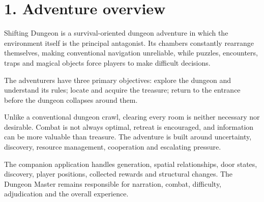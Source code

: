 \section{1. Adventure overview}

Shifting Dungeon is a survival-oriented dungeon adventure in which the environment itself is the principal antagonist. Its chambers constantly rearrange themselves, making conventional navigation unreliable, while puzzles, encounters, traps and magical objects force players to make difficult decisions.

The adventurers have three primary objectives: explore the dungeon and understand its rules; locate and acquire the treasure; return to the entrance before the dungeon collapses around them.

Unlike a conventional dungeon crawl, clearing every room is neither necessary nor desirable. Combat is not always optimal, retreat is encouraged, and information can be more valuable than treasure. The adventure is built around uncertainty, discovery, resource management, cooperation and escalating pressure.

The companion application handles generation, spatial relationships, door states, discovery, player positions, collected rewards and structural changes. The Dungeon Master remains responsible for narration, combat, difficulty, adjudication and the overall experience.
